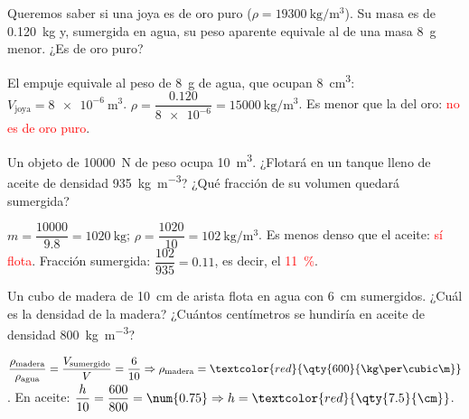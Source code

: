 \begin{exercise}
    Queremos saber si una joya es de oro puro (\(\rho = \qty{19300}{\kg\per\cubic\m}\)). Su masa es de \qty{0.120}{\kg} y, sumergida en agua, su peso aparente equivale al de una masa \qty{8}{\gram} menor. ¿Es de oro puro?
    \begin{solu}
        El empuje equivale al peso de \qty{8}{\gram} de agua, que ocupan \qty{8}{\cubic\cm}: \(V_{\text{joya}} = \qty{8e-6}{\cubic\m}\).
        \(\rho = \dfrac{\num{0.120}}{\num{8e-6}} = \qty{15000}{\kg\per\cubic\m}\). Es menor que la del oro: \textcolor{red}{no es de oro puro}.
    \end{solu}
\end{exercise}

\begin{exercise}
    Un objeto de \qty{10000}{\newton} de peso ocupa \qty{10}{\cubic\m}. ¿Flotará en un tanque lleno de aceite de densidad \qty{935}{\kg\per\cubic\m}? ¿Qué fracción de su volumen quedará sumergida?
    \begin{solu}
        \(m = \dfrac{10000}{\num{9.8}} = \qty{1020}{\kg}\); \(\rho = \dfrac{1020}{10} = \qty{102}{\kg\per\cubic\m}\). Es menos denso que el aceite: \textcolor{red}{sí flota}.
        Fracción sumergida: \(\dfrac{102}{935} = \num{0.11}\), es decir, el \textcolor{red}{\qty{11}{\percent}}.
    \end{solu}
\end{exercise}

\begin{exercise}
    Un cubo de madera de \qty{10}{\cm} de arista flota en agua con \qty{6}{\cm} sumergidos. ¿Cuál es la densidad de la madera? ¿Cuántos centímetros se hundiría en aceite de densidad \qty{800}{\kg\per\cubic\m}?
    \begin{solu}
        \(\dfrac{\rho_{\text{madera}}}{\rho_{\text{agua}}} = \dfrac{V_{\text{sumergido}}}{V} = \dfrac{6}{10} \Rightarrow \rho_{\text{madera}} = \textcolor{red}{\qty{600}{\kg\per\cubic\m}}\).
        En aceite: \(\dfrac{h}{10} = \dfrac{600}{800} = \num{0.75} \Rightarrow h = \textcolor{red}{\qty{7.5}{\cm}}\).
    \end{solu}
\end{exercise}

